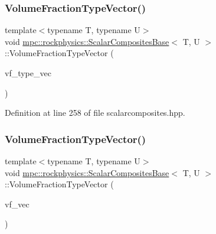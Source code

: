 \subsubsection{\texorpdfstring{Volume\+Fraction\+Type\+Vector()}{VolumeFractionTypeVector()}\hspace{0.1cm}{\footnotesize\ttfamily [2/3]}}
{\footnotesize\ttfamily template$<$typename T, typename U$>$ \\
void \mbox{\hyperlink{classmpc_1_1rockphysics_1_1_scalar_composites_base}{mpc\+::rockphysics\+::\+Scalar\+Composites\+Base}}$<$ T, U $>$\+::Volume\+Fraction\+Type\+Vector (\begin{DoxyParamCaption}\item[{std\+::vector$<$ \mbox{\hyperlink{structmpc_1_1rockphysics_1_1_volume_fraction_type}{mpc\+::rockphysics\+::\+Volume\+Fraction\+Type}}$<$ T $>$ $>$}]{vf\+\_\+type\+\_\+vec }\end{DoxyParamCaption})\hspace{0.3cm}{\ttfamily [inline]}}



Definition at line 258 of file scalarcomposites.\+hpp.

\mbox{\label{classmpc_1_1rockphysics_1_1_scalar_composites_base_a5b7ed116d7ae42d8119b3b7481998863}} 
\subsubsection{\texorpdfstring{Volume\+Fraction\+Type\+Vector()}{VolumeFractionTypeVector()}\hspace{0.1cm}{\footnotesize\ttfamily [3/3]}}
{\footnotesize\ttfamily template$<$typename T, typename U$>$ \\
void \mbox{\hyperlink{classmpc_1_1rockphysics_1_1_scalar_composites_base}{mpc\+::rockphysics\+::\+Scalar\+Composites\+Base}}$<$ T, U $>$\+::Volume\+Fraction\+Type\+Vector (\begin{DoxyParamCaption}\item[{std\+::vector$<$ T $>$ \&}]{vf\+\_\+vec }\end{DoxyParamCaption})\hspace{0.3cm}{\ttfamily [inline]}}



